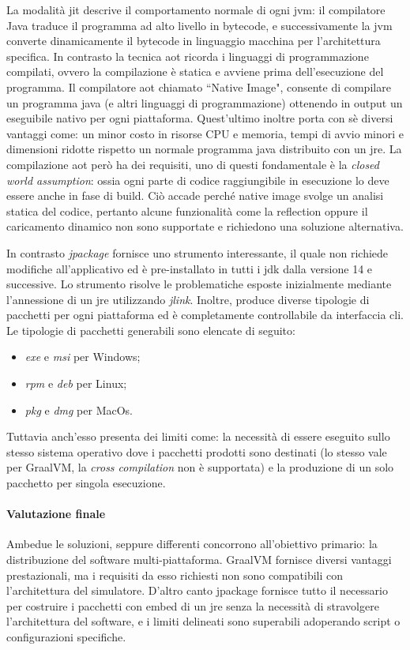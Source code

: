 La modalità \ac{jit} descrive il comportamento normale di ogni \ac{jvm}: il compilatore Java traduce il programma ad alto livello in bytecode, e successivamente la \ac{jvm} converte dinamicamente il bytecode in linguaggio macchina per l'architettura specifica. In contrasto la tecnica \ac{aot} ricorda i linguaggi di programmazione compilati, ovvero la compilazione è statica e avviene prima dell'esecuzione del programma. Il compilatore \ac{aot} chiamato ``Native Image", consente di compilare un programma java (e altri linguaggi di programmazione) ottenendo in output un eseguibile nativo per ogni piattaforma. Quest'ultimo inoltre porta con sè diversi vantaggi come: un minor costo in risorse CPU e memoria, tempi di avvio minori e dimensioni ridotte rispetto un normale programma java distribuito con un \ac{jre}. La compilazione \ac{aot} però ha dei requisiti, uno di questi fondamentale è la \textit{closed world assumption}: ossia ogni parte di codice raggiungibile in esecuzione lo deve essere anche in fase di build. Ciò accade perché native image svolge un analisi statica del codice, pertanto alcune funzionalità come la reflection oppure il caricamento dinamico non sono supportate e richiedono una soluzione alternativa.

In contrasto \textit{jpackage} fornisce uno strumento interessante, il quale non richiede modifiche all'applicativo ed è pre-installato in tutti i \ac{jdk} dalla versione 14 e successive. Lo strumento risolve le problematiche esposte inizialmente mediante l'annessione di un \ac{jre} utilizzando \textit{jlink}. Inoltre, produce diverse tipologie di pacchetti per ogni piattaforma ed è completamente controllabile da interfaccia \ac{cli}. Le tipologie di pacchetti generabili sono elencate di seguito:
\begin{itemize}
	\item \textit{exe} e \textit{msi} per Windows;
	\item \textit{rpm} e \textit{deb} per Linux;
	\item \textit{pkg} e \textit{dmg} per MacOs.
\end{itemize}
Tuttavia anch'esso presenta dei limiti come: la necessità di essere eseguito sullo stesso sistema operativo dove i pacchetti prodotti sono destinati (lo stesso vale per GraalVM, la \textit{cross compilation} non è supportata) e la produzione di un solo pacchetto per singola esecuzione.

\paragraph{Valutazione finale} Ambedue le soluzioni, seppure differenti concorrono all'obiettivo primario: la distribuzione del software multi-piattaforma. GraalVM fornisce diversi vantaggi prestazionali, ma i requisiti da esso richiesti non sono compatibili con l'architettura del simulatore. D'altro canto jpackage fornisce tutto il necessario per costruire i pacchetti con embed di un \ac{jre} senza la necessità di stravolgere l'architettura del software, e i limiti delineati sono superabili adoperando script o configurazioni specifiche.

